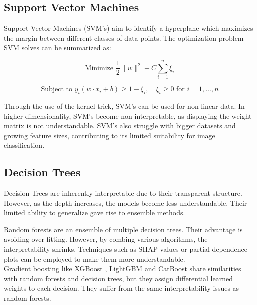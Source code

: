 \subsection{Support Vector Machines}


Support Vector Machines (SVM's) \cite{boser1992training} aim to identify a hyperplane which maximizes the margin between different classes of data points. The optimization problem SVM solves can be summarized as:

$$\text{Minimize } \frac{1}{2} \|w\|^2 + C \sum_{i=1}^{n} \xi_i$$

$$\text{Subject to } y_i (w \cdot x_i + b) \geq 1 - \xi_i, \quad \xi_i \geq 0 \text{ for } i = 1, \ldots, n$$

Through the use of the kernel trick, SVM's can be used for non-linear data. In higher dimensionality, SVM's become non-interpretable, as displaying the weight matrix is not understandable. SVM's also struggle with bigger datasets and growing feature sizes, contributing to its limited suitability for image classification.


\subsection{Decision Trees}
\label{decision_tree}

Decision Trees are inherently interpretable due to their transparent structure. However, as the depth increases, the models become less understandable. Their limited ability to generalize gave rise to ensemble methods.


 

Random forests are an ensemble of multiple decision trees. Their advantage is avoiding over-fitting. However, by combing various algorithms, the interpretability shrinks. Techniques such as SHAP values \cite{lundberg2017unified} or partial dependence plots \cite{PDP} can be employed to make them more understandable.
\\
Gradient boosting like XGBoost \cite{Chen_2016}, LightGBM \cite{Ke2017} and CatBoost \cite{prokhorenkova2019catboost} share similarities with random forests and decision trees, but they assign differential learned weights to each decision. They suffer from the same interpretability issues as random forests.

